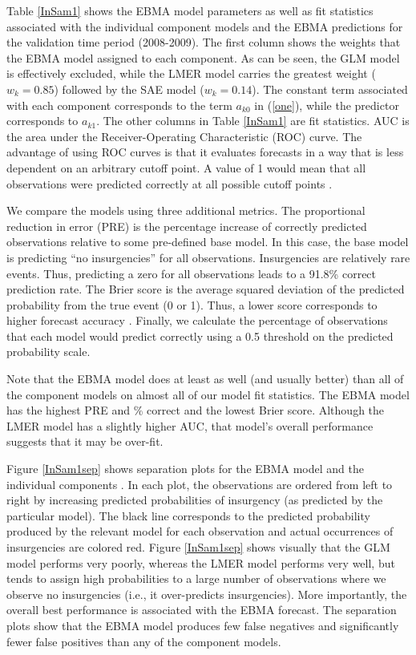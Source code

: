 Table \ref{InSam1} shows the EBMA model parameters as well as fit
statistics associated with the individual component models and the
EBMA predictions for the validation time period (2008-2009). The first
column shows the weights that the EBMA model assigned to each
component. As can be seen, the GLM model is effectively excluded,
while the LMER model carries the greatest weight ($w_k=0.85$)
followed by the SAE model ($w_k = 0.14$).  The constant term
associated with each component corresponds to the term $a_{k0}$ in
(\ref{one}), while the predictor corresponds to $a_{k1}$.  The other
columns in Table \ref{InSam1} are fit statistics.  AUC is the area
under the Receiver-Operating Characteristic (ROC) curve. The advantage
of using ROC curves is that it evaluates forecasts in a way that is
less dependent on an arbitrary cutoff point.  A value of 1 would mean
that all observations were predicted correctly at all possible cutoff
points \citep{King:Zeng:2001}.

  
We compare the models using three additional metrics.  The
proportional reduction in error (PRE) is the percentage increase of
correctly predicted observations relative to some pre-defined base
model. In this case, the base model is predicting ``no insurgencies''
for all observations.  Insurgencies are relatively rare events.  Thus,
predicting a zero for all observations leads to a 91.8\% correct
prediction rate. The Brier score is the average squared deviation of
the predicted probability from the true event (0 or 1).  Thus, a lower
score corresponds to higher forecast accuracy \citep{Brier:1950}.
Finally, we calculate the percentage of observations that each model
would predict correctly using a 0.5 threshold on the predicted
probability scale.


Note that the EBMA model does at least as well (and usually better)
than all of the component models on almost all of our model fit statistics.
The EBMA model has the highest PRE and \% correct and the lowest Brier
score.  Although the LMER model has a slightly higher AUC, that
model's overall performance suggests that it may be over-fit.


Figure \ref{InSam1sep} shows separation plots for the EBMA model and
the individual components \citep{Greenhill:2011}. In each plot, the
observations are ordered from left to right by increasing predicted
probabilities of insurgency (as predicted by the particular
model). The black line corresponds to the predicted probability
produced by the relevant model for each observation and actual
occurrences of insurgencies are colored red.  Figure \ref{InSam1sep}
shows visually that the GLM model performs very poorly, whereas the
LMER model performs very well, but tends to assign high probabilities
to a large number of observations where we observe no insurgencies
(i.e., it over-predicts insurgencies).  More importantly, the overall
best performance is associated with the EBMA forecast. The separation
plots show that the EBMA model produces few false negatives and
significantly fewer false positives than any of the component models.


